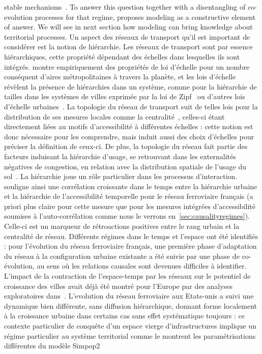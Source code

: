 {stable mechanisms~\cite{sanders1992systeme}. To answer this question together with a disentangling of co-evolution processes for that regime, \cite{bretagnolle:tel-00459720} proposes modeling as a constructive element of answer. We will see in next section how modeling can bring knowledge about territorial processes.
}{
Un aspect des réseaux de transport qu'il est important de considérer est la notion de hiérarchie. Les réseaux de transport sont par essence hiérarchiques, cette propriété dépendant des échelles dans lesquelles ils sont intégrés. \cite{10.1371/journal.pone.0102007} montre empiriquement des propriétés de loi d'échelle pour un nombre conséquent d'aires métropolitaines à travers la planète, et les lois d'échelle révèlent la présence de hiérarchies dans un système\comment[FL]{$\simeq$}, comme pour la hiérarchie de tailles dans les systèmes de villes exprimée par la loi de Zipf~\cite{nitsch2005zipf} ou d'autres lois d'échelle urbaines~\cite{2013arXiv1301.1674A,2015arXiv151000902B}. La topologie du réseau de transport suit de telles lois pour la distribution de ses mesures locales comme la centralité~\cite{samaniego2008cities}, celles-ci étant directement liées au motifs d'accessibilité à différentes échelles : cette notion est donc nécessaire pour les comprendre, mais induit aussi des choix d'échelles pour préciser la définition de ceux-ci. De plus, la topologie du réseau fait partie des facteurs induisant la hiérarchie d'usage, se retrouvant dans les externalités négatives de congestion, en relation avec la distribution spatiale de l'usage du sol~\cite{Tsekeris20131}. La hiérarchie joue un rôle particulier dans les processus d'interaction. \cite{bretagnolle:tel-00459720} souligne ainsi une corrélation croissante dans le temps entre la hiérarchie urbaine et la hiérarchie de l'accessibilité temporelle pour le réseau ferroviaire français (a priori plus claire pour cette mesure que pour les mesures intégrées d'accessibilité soumises à l'auto-corrélation comme nous le verrons en~\ref{sec:causalityregimes}). Celle-ci est un marqueur de rétroactions positives entre le rang urbain et la centralité de réseau. Différents régimes dans le temps et l'espace ont été identifiés : pour l'évolution du réseau ferroviaire français, une première phase d'adaptation du réseau à la configuration urbaine existante a été suivie par une phase de co-évolution, au sens où les relations causales sont devenues difficiles à identifier. L'impact de la contraction de l'espace-temps par les réseaux sur le potentiel de croissance des villes avait déjà été montré pour l'Europe par des analyses exploratoires dans~\cite{bretagnolle1998space}. L'evolution du réseau ferroviaire aux Etats-unis a suivi une dynamique bien différente, sans diffusion hiérarchique, donnant forme localement à la croissance urbaine dans certains cas sans effet systématique toujours : ce contexte particulier de conquête d'un espace vierge d'infrastructures implique un régime particulier au système territorial comme le montrent les paramétrisations différentes du modèle Simpop2 }
